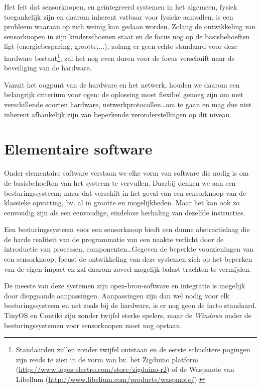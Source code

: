 Het feit dat sensorknopen, en ge\"integreerd systemen in het algemeen, fysiek
toegankelijk zijn en daarom inherent vatbaar voor fysieke aanvallen, is een
probleem waaraan op zich weinig kan gedaan worden. Zolang de ontwikkeling van
sensorknopen in zijn kinderschoenen staat en de focus nog op de basisbehoeften
ligt (energiebesparing, grootte,...), zolang er geen echte standaard voor deze
hardware bestaat\footnote{Standaarden zullen zonder twijfel ontstaan en de
eerste schuchtere pogingen zijn reeds te zien in de vorm van bv. het Zigduino
platform (\url{http://www.logos-electro.com/store/zigduino-r2}) of de Waspmote
van Libellum (\url{http://www.libelium.com/products/waspmote/}).}, zal het nog
even duren voor de focus verschuift naar de beveiliging van de hardware.

Vanuit het oogpunt van de hardware en het netwerk, houden we daarom een
belangrijk criterium voor ogen: de oplossing moet flexibel genoeg zijn om met
verschillende soorten hardware, netwerkprotocollen\dots om te gaan en mag dus
niet inherent afhankelijk zijn van beperkende veronderstellingen op dit niveau.

\vspace{-3mm}

\section{Elementaire software}
\label{section:solution-software}

Onder elementaire software verstaan we elke vorm van software die nodig is om
de basisbehoeften van het systeem te vervullen. Daarbij denken we aan een
besturingssysteem; maar dat verschilt in het geval van een sensorknoop van de
klassieke opvatting, bv. al in grootte en mogelijkheden. Maar het kan ook zo
eenvoudig zijn als een eenvoudige, eindeloze herhaling van dezelfde instructies.

Een besturingssysteem voor een sensorknoop biedt een dunne abstractielaag die
de harde realiteit van de programmatie van een naakte \mcu verlicht door de
introductie van processen, componenten\dots Gegeven de beperkte voorzieningen
van een sensorknoop, focust de ontwikkeling van deze systemen zich op het
beperken van de eigen impact en zal daarom zoveel mogelijk balast trachten te
vermijden.

De meeste van deze systemen zijn open-bron-software en integratie is mogelijk
door diepgaande aanpassingen. Aanpassingen zijn dan wel nodig voor elk
besturingssysteem en net zoals bij de hardware, is er nog geen de facto
standaard. TinyOS en Contiki zijn zonder twijfel sterke spelers, maar de
\emph{Windows} onder de besturingssystemen voor sensorknopen moet nog opstaan.

